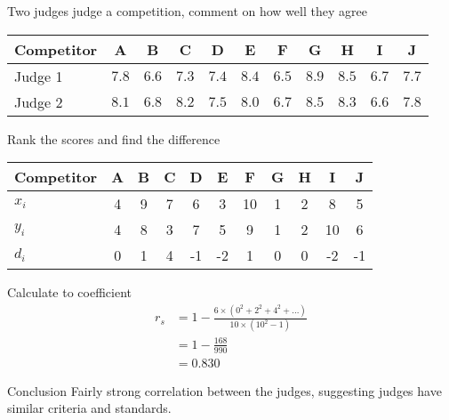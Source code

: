         \begin{example}
        {
            Two judges judge a competition, comment on how well they agree

            \begin{center}
            \begin{tabular}{l|c|c|c|c|c|c|c|c|c|c}
            Competitor & A & B & C & D & E & F & G & H & I & J \\
            \hline
            Judge 1 & $7.8$ & $6.6$ & $7.3$ & $7.4$ & $8.4$ & $6.5$ & $8.9$ & $8.5$ & $6.7$ & $7.7$ \\
            Judge 2 & $8.1$ & $6.8$ & $8.2$ & $7.5$ & $8.0$ & $6.7$ & $8.5$ & $8.3$ & $6.6$ & $7.8$ \\
            \end{tabular}
            \end{center}
        }

        \begin{step}{Rank the scores and find the difference}
        \begin{center}
        \begin{tabular}{l|c|c|c|c|c|c|c|c|c|c}
        Competitor & A & B & C & D & E & F & G & H & I & J \\
        \hline
        $x_i$ & 4 & 9 & 7 & 6 & 3 & 10 & 1 & 2 & 8 & 5 \\
        $y_i$ & 4 & 8 & 3 & 7 & 5 & 9 & 1 & 2 & 10 & 6 \\
        $d_i$ & 0 & 1 & 4 & -1 & -2 & 1 & 0 & 0 & -2 & -1 \\
        \end{tabular}
        \end{center}
        \end{step}

        \begin{step}{Calculate to coefficient}
        \begin{align*}
        r_s &= 1 - \frac{6 \times (0^2 + 2^2 +4^2 + ...)}{10 \times (10^2-1)}\\
        &= 1 - \frac{168}{990}\\
        &= 0.830
        \end{align*}
        \end{step}

        \begin{step}{Conclusion}
        Fairly strong correlation between the judges, suggesting judges have similar criteria and standards.
        \end{step}

        \end{example}

